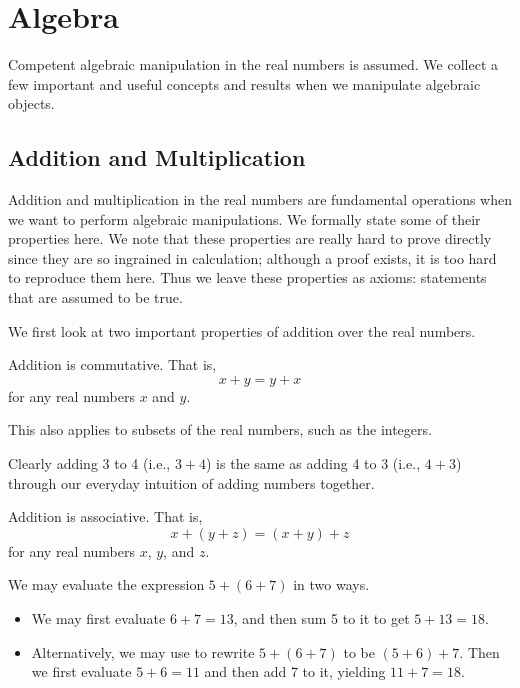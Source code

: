 \chapter{Algebra}
Competent algebraic manipulation in the real numbers is assumed. We collect a few important and useful concepts and results when we manipulate algebraic objects.

\section{Addition and Multiplication}
Addition and multiplication in the real numbers are fundamental operations when we want to perform algebraic manipulations. We formally state some of their properties here. We note that these properties are really hard to prove directly since they are so ingrained in calculation; although a proof exists, it is too hard to reproduce them here. Thus we leave these properties as axioms: statements that are assumed to be true.

We first look at two important properties of addition over the real numbers.
\begin{axiom}\label{axiom-addition-is-commutative}
    Addition is commutative. That is,
    \[
        x + y = y + x
    \]
    for any real numbers $x$ and $y$.
\end{axiom}
\begin{remark}
    This also applies to subsets of the real numbers, such as the integers.
\end{remark}
\begin{example}
    Clearly adding 3 to 4 (i.e., $3 + 4$) is the same as adding 4 to 3 (i.e., $4 + 3$) through our everyday intuition of adding numbers together.
\end{example}

\begin{axiom}\label{axiom-addition-is-associative}
    Addition is associative. That is, 
    \[
        x+(y+z) = (x+y)+z
    \]
    for any real numbers $x$, $y$, and $z$.
\end{axiom}
\begin{example}
    We may evaluate the expression $5+(6+7)$ in two ways.
    \begin{itemize}
        \item We may first evaluate $6+7 = 13$, and then sum 5 to it to get $5 + 13 = 18$.
        \item Alternatively, we may use  to rewrite $5+(6+7)$ to be $(5+6)+7$. Then we first evaluate $5+6 = 11$ and then add 7 to it, yielding $11 + 7 = 18$.
    \end{itemize}
\end{example}

